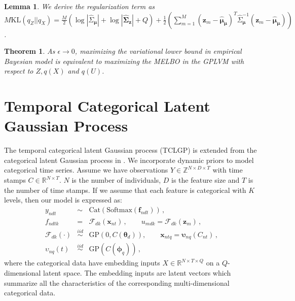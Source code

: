 \documentclass{article}
\newtheorem{lemma}{Lemma}
\newtheorem{theorem}{Theorem}
\begin{document}
\begin{lemma}
	We derive the regularization term as  $M\mathrm{KL}(q_Z || q_X) = \frac{M}{2}(\log |\hat{\Sigma}_{\bm \mu}| + \log|\hat{\bm\Sigma}_{\bm z}| + Q) + \frac{1}{2}\left(\sum_{m = 1}^M(\bm z_m - \hat{\bm \mu}_{\bm \mu})^T\hat{\Sigma}_{\bm\mu}^{-1}(\bm z_m - \hat{\bm \mu}_{\bm \mu})\right)$.
\end{lemma}

\begin{theorem}
	As $\epsilon \rightarrow 0$, maximizing the variational lower bound in empirical Bayesian model is equivalent to maximizing the MELBO in the GPLVM with respect to $Z, q(X)$ and $q(U)$.
\end{theorem}

\section{Temporal Categorical Latent Gaussian Process} \label{sec:TCLGP}

The temporal categorical latent Gaussian process (TCLGP) is extended from the categorical latent Gaussian process in \cite{Gal_2015}. We incorporate dynamic priors \citep{Lawrence_2007_HGP, Damianou_2016} to model categorical time series. Assume we have observations $Y \in \mathbb{Z}^{N\times D \times T}$ with time stamps $C \in \mathbb{R}^{N\times T}$. $N$ is the number of individuals, $D$ is the feature size and $T$ is the number of time stamps. If we assume that each feature is categorical with $K$ levels, then our model is expressed as:
\begin{eqnarray}
y_{ndt} & \sim & \mathrm{Cat}(\mathrm{Softmax}(\bm f_{ndt})) \,, \nonumber \\
f_{ndtk} & = & \mathcal{F}_{dk}(\bm x_{nt}) \,, \qquad u_{mdk} = \mathcal{F}_{dk}(\bm z_{m}) \,, \nonumber \\
\mathcal{F}_{dk}(\cdot) & \stackrel{iid}{\sim} & \mathrm{GP}(0,C(\bm \theta_d)), \qquad \bm x_{ntq} = \bm \upsilon_{nq}(C_{nt}) \,, \nonumber \\
\upsilon_{nq}(t) & \stackrel{iid}{\sim} & \mathrm{GP}(C(\bm{\phi}_q)) \nonumber \,,
\end{eqnarray}
where the categorical data have embedding inputs $X \in \mathbb{R}^{N\times T \times Q}$ on a $Q$-dimensional latent space. The embedding inputs are latent vectors which summarize all the characteristics of the corresponding multi-dimensional categorical data.
\end{document}
